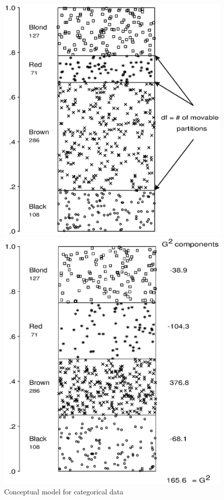 \begin{figure}[htb]
 \begin{minipage}[t]{.49\linewidth}
  \includegraphics[width=1\linewidth,clip]{ch1/fig/mosdemo3}
 \end{minipage}%
 \hfill
 \begin{minipage}[t]{.49\linewidth}
  \includegraphics[width=1\linewidth,clip]{ch1/fig/mosdemo4}
 \end{minipage}
 \caption{Conceptual model for categorical data}\label{fig:mosdemo}
\end{figure}

